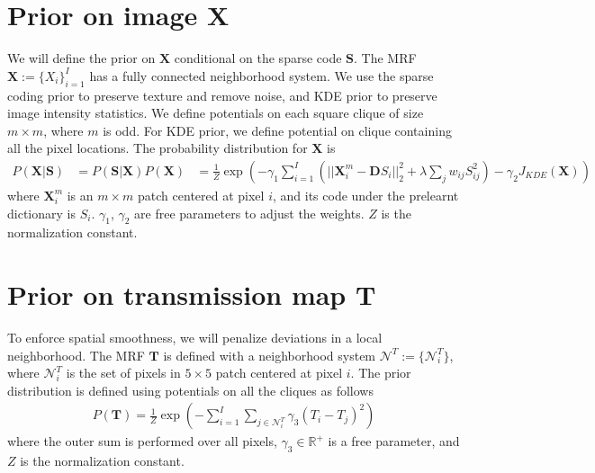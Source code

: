 \section{Prior on image $\mathbf{X}$}
We will define the prior on $\mathbf{X}$ conditional on the sparse code $\mathbf{S}$. The MRF $\mathbf{X} := \lbrace X_i \rbrace_{i=1}^{I}$ has a fully connected neighborhood system. We use the sparse coding prior to preserve texture and remove noise, and KDE prior to preserve image intensity statistics. We define potentials on each square clique of size $m \times m$, where $m$ is odd. For KDE prior, we define potential on clique containing all the pixel locations. The probability distribution for $\mathbf{X}$ is
\begin{align}
    P\left(\mathbf{X} |\mathbf{S}\right) &= P \left (\mathbf{S} | \mathbf{X} \right) P\left( \mathbf{X} \right) &= \frac{1}{Z} \exp \left( -\gamma_1 \sum_{i=1}^{I} \left( || \mathbf{X}_i^m - \mathbf{D} S_i ||_2^2 + \lambda \sum_{j} w_{ij} S_{ij}^2 \right) - \gamma_2 J_{KDE} \left( \mathbf{X} \right) \right) \label{eqn:xGivenS}
\end{align}
where $\mathbf{X}_i^m$ is an $m \times m$ patch centered at pixel $i$, and its code under the prelearnt dictionary is $S_i$. $\gamma_1$, $\gamma_2$ are free parameters to adjust the weights. $Z$ is the normalization constant.


\section{Prior on transmission map $\mathbf{T}$}
To enforce spatial smoothness, we will penalize deviations in a local neighborhood. The MRF $\mathbf{T}$ is defined with a neighborhood system $\mathcal{N}^T := \lbrace \mathcal{N}_i^T \rbrace$, where $\mathcal{N}_i^T$ is the set of pixels in $5 \times 5$ patch centered at pixel $i$. The prior distribution is defined using potentials on all the cliques as follows
\begin{align}
    P(\mathbf{T}) = \frac{1}{Z} \exp \left( - \sum_{i=1}^{I} \sum_{j \in \mathcal{N}_i^T} \gamma_3 (T_i - T_j)^2 \right) \label{eqn:spatialsmoothness}
\end{align}
where the outer sum is performed over all pixels, $\gamma_3 \in \mathbb{R}^+$ is a free parameter, and $Z$ is the normalization constant.
